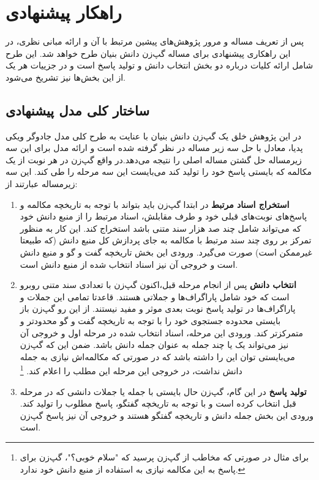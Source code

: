 \chapter{راهکار پیشنهادی}\label{chap4}
\minitoc

پس از تعریف مساله و مرور پژوهش‌های پیشین مرتبط با آن و ارائه مبانی نظری، در این راهکاری پیشنهادی برای مساله گپ‌زن دانش بنیان طرح خواهد شد. این طرح شامل ارائه کلیات درباره دو بخش انتخاب دانش و تولید پاسخ است و در جزییات هر یک از این بخش‌ها نیز تشریخ می‌شود. 


\section{ساختار کلی مدل پیشنهادی}
در این پژوهش خلق یک گپ‌زن دانش بنیان 
با عنایت به طرح کلی مدل جادوگر ویکی پدیا،
معادل با حل سه زیر مساله در نظر گرفته شده است و ارائه مدل برای این سه زیرمساله حل گشتن مساله اصلی را نتیجه می‌دهد.در واقع گپ‌زن در هر نوبت از یک مکالمه که بایستی پاسخ خود را تولید کند می‌بایست این سه مرحله را طی کند. این سه زیرمساله عبارتند از:

\begin{enumerate}
	\item 
	\textbf{استخراج اسناد مرتبط}
	در ابتدا گپ‌زن باید بتواند با توجه به تاریخچه مکالمه و پاسخ‌های نوبت‌های قبلی خود و طرف مقابلش، اسناد مرتبط را از منبع دانش خود که می‌تواند شامل چند صد هزار سند متنی باشد استخراج کند. این کار به منظور تمرکز بر روی چند سند مرتبط با مکالمه به جای پردازش کل منبع دانش (که طبیعتا غیرممکن است) صورت می‌گیرد. ورودی این بخش تاریخچه گفت‌ و گو و منبع دانش است و خروجی آن نیز اسناد انتخاب شده از منبع دانش است. 
	\item 
	\textbf{انتخاب دانش}
	پس از انجام مرحله قبل،‌اکنون گپ‌زن با تعدادی سند متنی روبرو است که خود شامل پاراگراف‌ها و جملاتی هستند. قاعدتا تمامی این جملات و پاراگراف‌ها در تولید پاسخ نوبت‌ بعدی موثر و مفید نیستند. از این رو گپ‌زن باز بایستی محدوده جستجوی خود را
	با توجه به تاریخچه گفت و گو محدودتر و متمرکزتر کند. 
	ورودی این مرحله، اسناد انتخاب شده در مرحله اول و خروجی آن نیز می‌تواند یک یا چند جمله 
	به عنوان جمله دانش باشد. ضمن این که گپ‌زن می‌بایستی توان این را داشته باشد که در صورتی که مکالمه‌اش نیازی به جمله دانش نداشت، در خروجی این مرحله این مطلب را اعلام کند. 
\footnote{برای مثال در صورتی که مخاطب از گپ‌زن پرسید که "سلام خوبی؟"، گپ‌زن برای پاسخ به این مکالمه نیازی به استفاده از منبع دانش خود ندارد.}
	\item
	\textbf{تولید پاسخ}
	در این گام، گپ‌زن حال بایستی با جمله یا جملات دانشی که در مرحله قبل انتخاب کرده است و با توجه به تاریخچه گفتگو، پاسخ مطلوب را تولید کند. ورودی این بخش جمله دانش و تاریخچه گفتگو هستند و خروجی آن نیز پاسخ گپ‌زن است. 
	
	
\end{enumerate}

